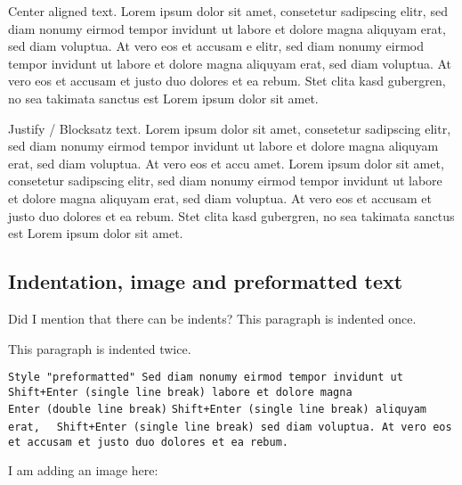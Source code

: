 \begin{center}Center aligned
text. Lorem ipsum dolor sit amet, consetetur sadipscing elitr,
sed diam nonumy eirmod tempor invidunt ut labore et dolore magna
aliquyam erat, sed diam voluptua. At vero eos et accusam e elitr,
sed diam nonumy eirmod tempor invidunt ut labore et dolore magna
aliquyam erat, sed diam voluptua. At vero eos et accusam et justo
duo dolores et ea rebum. Stet clita kasd gubergren, no sea takimata
sanctus est Lorem ipsum dolor sit amet.
\end{center}

Justify /
Blocksatz text. Lorem ipsum dolor sit amet, consetetur
sadipscing elitr, sed diam nonumy eirmod tempor invidunt ut labore
et dolore magna aliquyam erat, sed diam voluptua. At vero eos et
accu amet. Lorem ipsum dolor sit amet, consetetur sadipscing elitr,
sed diam nonumy eirmod tempor invidunt ut labore et dolore magna
aliquyam erat, sed diam voluptua. At vero eos et accusam et justo
duo dolores et ea rebum. Stet clita kasd gubergren, no sea takimata
sanctus est Lorem ipsum dolor sit amet.

\subsection{Indentation, image and preformatted text}

\begin{adjustwidth}{2cm}{}Did I mention
that there can be indents? This paragraph is indented once.
\end{adjustwidth}

\begin{adjustwidth}{4cm}{}This paragraph
is indented twice.
\end{adjustwidth}


\texttt{Style "preformatted" Sed diam nonumy eirmod tempor invidunt ut \\Shift+Enter (single line break) labore et dolore magna\\  Enter (double line break)}
\texttt{Shift+Enter (single line break) aliquyam erat, }
\texttt{   Shift+Enter (single line break) sed diam voluptua. At vero eos et accusam et justo duo dolores et ea rebum.}

I am adding an image here:

\renewcommand{\varCaption}{This is an image with the caption: There are three minutes left on the clock.}
\renewcommand{\varImgPath}{_content/images/3minutes700x400.jpg}


